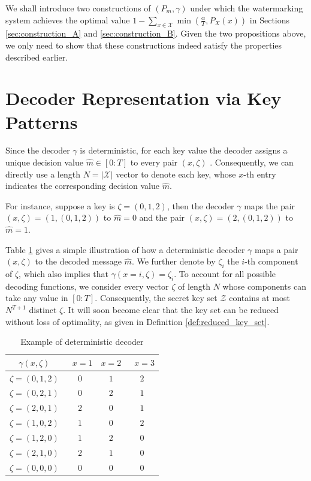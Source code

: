 \documentclass[11pt,letterpaper]{article}
\newcommand{\cX}{\mathcal{X}}
\newcommand{\cZ}{\mathcal{Z}}
\begin{document}
We shall introduce two constructions of $(P_m, \gamma)$ under which the watermarking system achieves the optimal value $1 - \sum_{x\in \cX} \min\left(\tfrac{\alpha}{T}, P_X(x)\right)$ in Sections \ref{sec:construction_A} and \ref{sec:construction_B}. Given the two propositions above, we only need to show that these constructions indeed satisfy the properties described earlier.

\section{Decoder Representation via Key Patterns}
Since the decoder $\gamma$ is deterministic, for each key value the decoder assigns a unique decision value $\hat{m} \in [0:T]$ to every pair $(x,\zeta)$ . Consequently, we can directly use a length $N = |\cX|$ vector to denote each key, whose $x$-th entry indicates the corresponding decision value $\hat{m}$. 

For instance, suppose a key is $\zeta=(0, 1, 2)$, then the decoder $\gamma$ maps the pair $(x,\zeta)=(1, (0, 1, 2))$ to $\hat{m} = 0$ and the pair $(x,\zeta)=(2, (0, 1, 2))$ to $\hat{m} = 1$.

Table \ref{tab:deterministic_dec_example} gives a simple illustration of how a deterministic decoder $\gamma$ maps a pair $(x, \zeta)$ to the decoded message $\hat{m}$. We further denote by $\zeta_i$ the $i$-th component of $\zeta$, which also implies that $\gamma(x = i, \zeta) = \zeta_i$. To account for all possible decoding functions, we consider every vector $\zeta$ of length $N$ whose components can take any value in $[0:T]$. Consequently, the secret key set $\cZ$ contains at most $N^{T+1}$ distinct $\zeta$. It will soon become clear that the key set can be reduced without loss of optimality, as given in Definition \ref{def:reduced_key_set}.


\begin{table}
\centering
\begin{tabular}{c|c|c|c}
$\gamma(x,\zeta)$   & ~$x = 1$ & $x = 2$ & ~$x = 3$  \\ 
\hline
$\zeta = (0, 1, 2)$ & $0$     & $1$     & $2$       \\ 
\hline
$\zeta = (0, 2, 1)$ & $0$     & $2$     & $1$           \\ 
\hline
$\zeta = (2, 0, 1)$ & $2$     & $0$     & $1$           \\ 
\hline
$\zeta = (1, 0, 2)$ & $1$     & $0$     & $2$             \\ 
\hline
$\zeta = (1, 2, 0)$ & $1$      & $2$     & $0$           \\ 
\hline
$\zeta = (2, 1, 0)$ & $2$     & $1$     & $0$            \\ 
\hline
$\zeta = (0, 0, 0)$ & $0$     & $0$     & $0$          
\end{tabular}
\caption{Example of deterministic decoder}
\label{tab:deterministic_dec_example}
\end{table}
\end{document}
